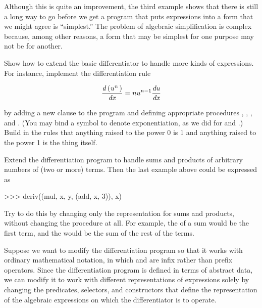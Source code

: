 Although this is quite an improvement, the third example shows that there is
still a long way to go before we get a program that puts expressions into a
form that we might agree is ``simplest.''  The problem of algebraic
simplification is complex because, among other reasons, a form that may be
simplest for one purpose may not be for another.

\begin{exerciseGroup}
\label{Exercise 2.56}
 Show how to extend the basic
differentiator to handle more kinds of expressions.  For instance, implement
the differentiation rule

$$ \frac{{\it d\,(u^n\,)}}{{\it dx}} = nu^{n-1} \frac{{\it du}}{{\it dx}} $$

\noindent
by adding a new clause to the  program and defining appropriate
procedures , , , and
.  (You may bind a symbol  to denote
exponentiation, as we did for  and .)  Build in the rules
that anything raised to the power 0 is 1 and anything raised to the power 1 is
the thing itself.

\label{Exercise 2.57}
 Extend the differentiation
program to handle sums and products of arbitrary numbers of (two or more)
terms.  Then the last example above could be expressed as

\begin{codeBlock}
>>> deriv((mul, x, y, (add, x, 3)), x)
\end{codeBlock}

Try to do this by changing only the representation for sums and products,
without changing the  procedure at all.  For example, the
 of a sum would be the first term, and the  would be
the sum of the rest of the terms.

\label{Exercise 2.58}
 Suppose we want to modify the
differentiation program so that it works with ordinary mathematical notation,
in which  and  are infix rather than prefix operators.
Since the differentiation program is defined in terms of abstract data, we can
modify it to work with different representations of expressions solely by
changing the predicates, selectors, and constructors that define the
representation of the algebraic expressions on which the differentiator is to
operate.


\end{exerciseGroup}
